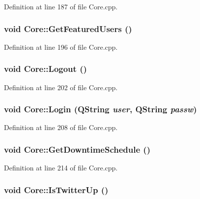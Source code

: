 Definition at line 187 of file Core.cpp.\hypertarget{classCore_c5f77029d34a1427c6b8a491c646e80b}{
\subsubsection{\setlength{\rightskip}{0pt plus 5cm}void Core::GetFeaturedUsers ()}}
\label{classCore_c5f77029d34a1427c6b8a491c646e80b}




Definition at line 196 of file Core.cpp.\hypertarget{classCore_e4ec033e04b6490ac08d6f07507bc9c2}{
\subsubsection{\setlength{\rightskip}{0pt plus 5cm}void Core::Logout ()}}
\label{classCore_e4ec033e04b6490ac08d6f07507bc9c2}




Definition at line 202 of file Core.cpp.\hypertarget{classCore_4570f9ad07c0ba58ce6326eb76568bf6}{
\subsubsection{\setlength{\rightskip}{0pt plus 5cm}void Core::Login (QString {\em user}, \/  QString {\em passw})}}
\label{classCore_4570f9ad07c0ba58ce6326eb76568bf6}




Definition at line 208 of file Core.cpp.\hypertarget{classCore_7ba2a526280dcfc427480956f90f29cb}{
\subsubsection{\setlength{\rightskip}{0pt plus 5cm}void Core::GetDowntimeSchedule ()}}
\label{classCore_7ba2a526280dcfc427480956f90f29cb}




Definition at line 214 of file Core.cpp.\hypertarget{classCore_eeaa4a9429ac0a0dd2c2d11c0c0eea81}{
\subsubsection{\setlength{\rightskip}{0pt plus 5cm}void Core::IsTwitterUp ()}}
\label{classCore_eeaa4a9429ac0a0dd2c2d11c0c0eea81}




